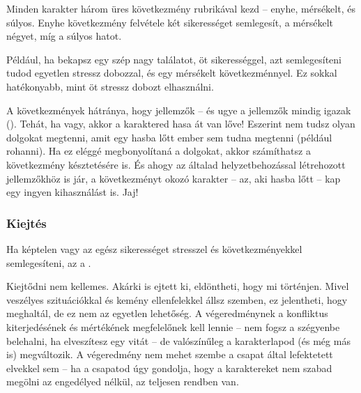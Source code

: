 Minden karakter három üres következmény rubrikával kezd – enyhe, mérsékelt, és súlyos. Enyhe következmény felvétele két sikerességet semlegesít, a mérsékelt négyet, míg a súlyos hatot.

Például, ha bekapsz egy szép nagy találatot, öt sikerességgel, azt semlegesíteni tudod egyetlen stressz dobozzal, és egy mérsékelt következménnyel. Ez sokkal hatékonyabb, mint öt stressz dobozt elhasználni.

\newpage

A következmények hátránya, hogy jellemzők – és ugye a jellemzők mindig igazak (). Tehát, ha  vagy, akkor a karaktered hasa át van lőve! Eszerint nem tudsz olyan dolgokat megtenni, amit egy hasba lőtt ember sem tudna megtenni (például rohanni). Ha ez eléggé megbonyolítaná a dolgokat, akkor számíthatsz a következmény késztetésére is. És ahogy az általad helyzetbehozással létrehozott jellemzőkhöz is jár, a következményt okozó karakter – az, aki hasba lőtt – kap egy ingyen kihasználást is. Jaj!


\subsubsection{Kiejtés}

Ha képtelen vagy az egész sikerességet stresszel és következményekkel semlegesíteni, az a .

Kiejtődni nem kellemes. Akárki is ejtett ki, eldöntheti, hogy mi történjen. Mivel veszélyes szituációkkal és kemény ellenfelekkel állsz szemben, ez jelentheti, hogy meghaltál, de ez nem az egyetlen lehetőség. A végeredménynek a konfliktus kiterjedésének és mértékének megfelelőnek kell lennie – nem fogsz a szégyenbe belehalni, ha elveszítesz egy vitát – de valószínűleg a karakterlapod (és még más is) megváltozik. A végeredmény nem mehet szembe a csapat által lefektetett elvekkel sem – ha a csapatod úgy gondolja, hogy a karaktereket nem szabad megölni az engedélyed nélkül, az teljesen rendben van.

